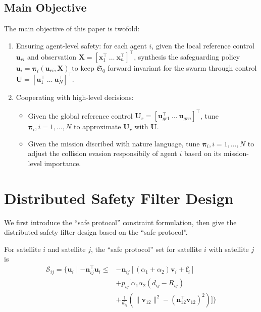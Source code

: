 \documentclass{ifacconf}
\begin{document}
\subsection{Main Objective}
\par The main objective of this paper is twofold:
\begin{enumerate}[label=\arabic*)]
   \item Ensuring agent-level safety: for each agent $i$, given the local reference control $\boldsymbol{u}_{ri}$ and observation $\boldsymbol{X} = [\boldsymbol{x}_1^{\top}~\dots~\boldsymbol{x}_n^{\top}]^{\top}$, synthesis the safeguarding policy $\boldsymbol{u}_i = \boldsymbol{\pi}_{i}(\boldsymbol{u}_{ri}, \boldsymbol{X})$ to keep $\mathfrak{S}_0$ forward invariant for the swarm through control $\boldsymbol{U} = [\boldsymbol{u}_1^\top~\dots~\boldsymbol{u}_N^\top]^\top$.
   \item Cooperating with high-level decisions: 
      \begin{itemize}
         \item Given the global reference control $\boldsymbol{U}_r = [\boldsymbol{u}_{gr1}^{\top}~\dots~\boldsymbol{u}_{grn}]^\top$, tune $\boldsymbol{\pi}_i, i = 1, \dots, N$ to approximate $\boldsymbol{U}_r$ with $\boldsymbol{U}$.
         \item Given the mission discribed with nature language, tune $\boldsymbol{\pi}_i, i = 1, \dots, N$ to adjust the collision evasion responsibily of agent $i$ based on its mission-level importance. 
      \end{itemize}
\end{enumerate}

\section{Distributed Safety Filter Design}
\par We first introduce the ``safe protocol'' constraint formulation, then give the distributed safety filter design based on the ``safe protocol''. 

\par For satellite $i$ and satellite $j$, the ``safe protocol'' set for satellite $i$ with satellite $j$ is 
\begin{equation}
   \begin{aligned}
      \mathcal{S}_{ij} = \{ \boldsymbol{u}_i \mid -\boldsymbol{n}_{ij}^\top \boldsymbol{u}_i \le& -\boldsymbol{n}_{ij}[(\alpha_1 + \alpha_2)\boldsymbol{v}_i + \boldsymbol{f}_i] \\
      &+ p_{ij}[\alpha_1 \alpha_2 (d_{ij} - R_{ij}) \\
      &+ \frac{1}{d_{ij}}(\|\boldsymbol{v}_{12}\|^2 - ( \boldsymbol{n}_{12}^{\top}\boldsymbol{v}_{12} )^2 )] \}
   \end{aligned}
\end{equation}
\end{document}
